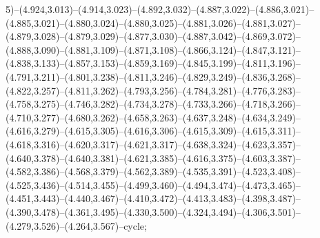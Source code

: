 5)--(4.924,3.013)--(4.914,3.023)--(4.892,3.032)--(4.887,3.022)--(4.886,3.021)--(4.885,3.021)--(4.880,3.024)--(4.880,3.025)--(4.881,3.026)--(4.881,3.027)--(4.879,3.028)--(4.879,3.029)--(4.877,3.030)--(4.887,3.042)--(4.869,3.072)--(4.888,3.090)--(4.881,3.109)--(4.871,3.108)--(4.866,3.124)--(4.847,3.121)--(4.838,3.133)--(4.857,3.153)--(4.859,3.169)--(4.845,3.199)--(4.811,3.196)--(4.791,3.211)--(4.801,3.238)--(4.811,3.246)--(4.829,3.249)--(4.836,3.268)--(4.822,3.257)--(4.811,3.262)--(4.793,3.256)--(4.784,3.281)--(4.776,3.283)--(4.758,3.275)--(4.746,3.282)--(4.734,3.278)--(4.733,3.266)--(4.718,3.266)--(4.710,3.277)--(4.680,3.262)--(4.658,3.263)--(4.637,3.248)--(4.634,3.249)--(4.616,3.279)--(4.615,3.305)--(4.616,3.306)--(4.615,3.309)--(4.615,3.311)--(4.618,3.316)--(4.620,3.317)--(4.621,3.317)--(4.638,3.324)--(4.623,3.357)--(4.640,3.378)--(4.640,3.381)--(4.621,3.385)--(4.616,3.375)--(4.603,3.387)--(4.582,3.386)--(4.568,3.379)--(4.562,3.389)--(4.535,3.391)--(4.523,3.408)--(4.525,3.436)--(4.514,3.455)--(4.499,3.460)--(4.494,3.474)--(4.473,3.465)--(4.451,3.443)--(4.440,3.467)--(4.410,3.472)--(4.413,3.483)--(4.398,3.487)--(4.390,3.478)--(4.361,3.495)--(4.330,3.500)--(4.324,3.494)--(4.306,3.501)--(4.279,3.526)--(4.264,3.567)--cycle;
